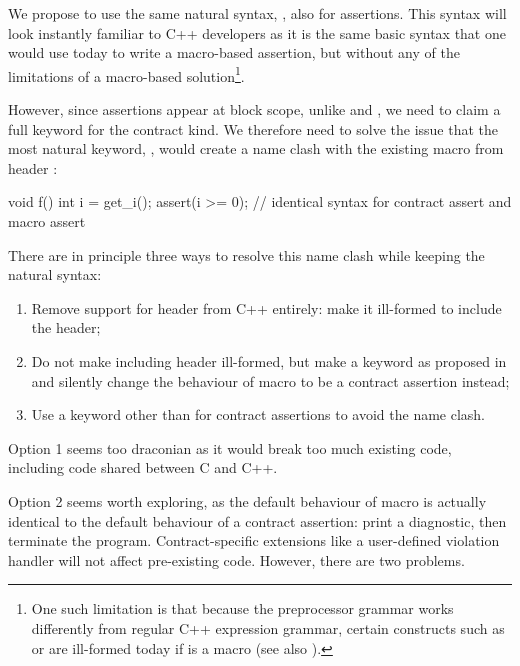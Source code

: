 We propose to use the same natural syntax, , also for assertions. This syntax will look instantly familiar to C++ developers as it is the same basic syntax that one would use today to write a macro-based assertion, but without any of the limitations of a macro-based solution\footnote{One such limitation is that because the preprocessor grammar works differently from regular C++ expression grammar, certain constructs such as  or  are ill-formed today if  is a macro (see also \cite{P2884R0}).}.

However, since assertions appear at block scope, unlike  and , we need to claim a full keyword for the contract kind. We therefore need to solve the issue that the most natural keyword, , would create a name clash with the existing  macro from header :

\vspace{2mm}
\begin{codeblock}
void f() {
  int i = get_i();
  assert(i >= 0);  // identical syntax for contract assert and macro assert
}
\end{codeblock}
\vspace{2mm}

There are in principle three ways to resolve this name clash while keeping the natural syntax:

\begin{enumerate}
\item Remove support for header  from C++ entirely: make it ill-formed to include the header;
\item Do not make including header  ill-formed, but make  a keyword as proposed in \cite{P2884R0} and silently change the behaviour of macro  to be a contract assertion instead;
\item Use a keyword other than  for contract assertions to avoid the name clash.
\end{enumerate}

Option 1 seems too draconian as it would break too much existing code, including code shared between C and C++.

Option 2 seems worth exploring, as the default behaviour of macro  is actually identical to the default behaviour of a contract assertion: print a diagnostic, then terminate the program. Contract-specific extensions like a user-defined violation handler will not affect pre-existing code. However, there are two problems.

